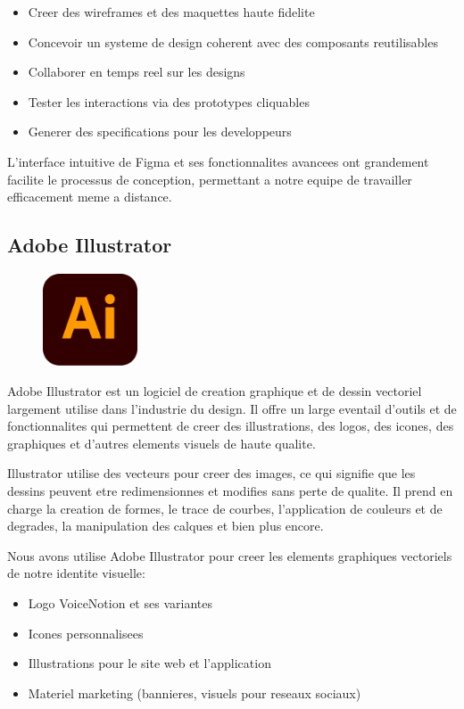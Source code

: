 \begin{itemize}
    \item Creer des wireframes et des maquettes haute fidelite
    \item Concevoir un systeme de design coherent avec des composants reutilisables
    \item Collaborer en temps reel sur les designs
    \item Tester les interactions via des prototypes cliquables
    \item Generer des specifications pour les developpeurs
\end{itemize}

L'interface intuitive de Figma et ses fonctionnalites avancees ont grandement facilite le processus de conception, permettant a notre equipe de travailler efficacement meme a distance.
\subsection{Adobe Illustrator}
\begin{figure}
    \centering
    \includegraphics[width=0.25\textwidth]{assets/docs/illustrator.png}
\end{figure}
Adobe Illustrator est un logiciel de creation graphique et de dessin vectoriel largement utilise dans l'industrie du design. Il offre un large eventail d'outils et de fonctionnalites qui permettent de creer des illustrations, des logos, des icones, des graphiques et d'autres elements visuels de haute qualite. 

Illustrator utilise des vecteurs pour creer des images, ce qui signifie que les dessins peuvent etre redimensionnes et modifies sans perte de qualite. Il prend en charge la creation de formes, le trace de courbes, l'application de couleurs et de degrades, la manipulation des calques et bien plus encore.

Nous avons utilise Adobe Illustrator pour creer les elements graphiques vectoriels de notre identite visuelle:

\begin{itemize}
    \item Logo VoiceNotion et ses variantes
    \item Icones personnalisees
    \item Illustrations pour le site web et l'application
    \item Materiel marketing (bannieres, visuels pour reseaux sociaux)
\end{itemize}

